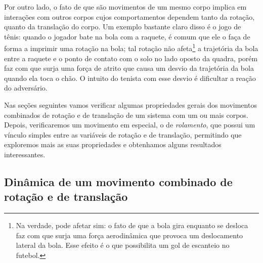 Por outro lado, o fato de que são movimentos de um mesmo corpo implica em interações com outros corpos cujos comportamentos dependem tanto da rotação, quanto da translação do corpo. Um exemplo bastante claro disso é o jogo de tênis: quando o jogador bate na bola com a raquete, é comum que ele o faça de forma a imprimir uma rotação na bola; tal rotação não afeta\footnote{Na verdade, pode afetar sim: o fato de que a bola gira enquanto se desloca faz com que surja uma força aerodinâmica que provoca um deslocamento lateral da bola. Esse efeito é o que possibilita um gol de escanteio no futebol.} a trajetória da bola entre a raquete e o ponto de contato com o solo no lado oposto da quadra, porém faz com que surja uma força de atrito que causa um desvio da trajetória da bola quando ela toca o chão. O intuito do tenista com esse desvio é dificultar a reação do adversário.

Nas seções seguintes vamos verificar algumas propriedades gerais dos movimentos combinados de rotação e de translação de um sistema com um ou mais corpos. Depois, verificaremos um movimento em especial, o de \emph{rolamento}, que possui um vínculo simples entre as variáveis de rotação e de translação, permitindo que exploremos mais as suas propriedades e obtenhamos alguns resultados interessantes.

\subsection{Dinâmica de um movimento combinado de rotação e de translação}

